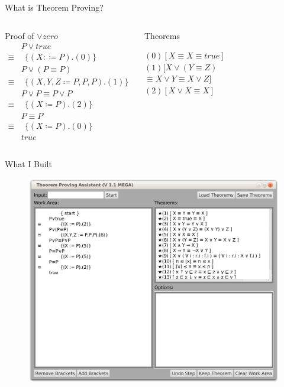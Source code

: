 \documentclass[11pt]{beamer}
\begin{document}
\begin{frame}{What is Theorem Proving?}

\begin{columns}[c]

\begin{block}{Proof of $\vee zero$}
\begin{align*}
&P \vee true \\
\equiv&\ \ \{(X:\coloneqq P).(0)\} \\
&P \vee ( P \equiv P ) \\
\equiv&\ \ \{(X,Y,Z\coloneqq P,P,P ).(1)\} \\
&P \vee P \equiv P \vee P \\
\equiv&\ \ \{(X \coloneqq P).(2)\} \\
&P \equiv P \\
\equiv&\ \ \{(X \coloneqq P).(0)\} \\
& true
\end{align*}
\end{block}

\begin{block}{Theorems}

$(0) [X \equiv X \equiv true ]$\\
$(1) [X \vee (Y \equiv Z)$\\
\qquad\qquad\qquad$ \equiv X \vee Y \equiv X \vee Z]$\\
$(2) [X \vee X \equiv X]$

\end{block}

\end{columns}

\end{frame}

\begin{frame}{What I Built}
\begin{figure}
\includegraphics[width=0.8\linewidth]{../TheReport/screenshot}
\end{figure}
\end{frame}
\end{document}
